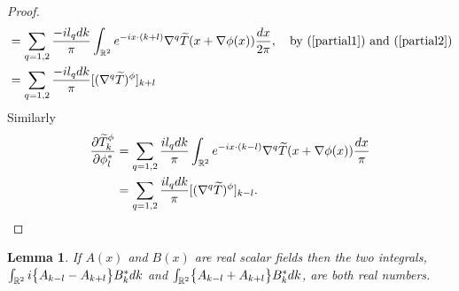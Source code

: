 \documentclass[noinfoline]{imsart}
\newtheorem{lemma}{Lemma}
\begin{document}
\begin{proof}
\begin{align}
\nonumber &= \sum_{q=1,2}\frac{ - il_q  dk}{\pi}  \int_{\Bbb R^2} e^{- ix \cdot (k+l)} \nabla^q\widetilde T(x+\nabla \phi(x))\frac{dx}{2\pi},\quad\text{by (\ref{partial1}) and (\ref{partial2})} \\
&=\sum_{q=1,2}\frac{ - il_q dk}{\pi} [(\nabla^q\widetilde T)^\phi]_{k+l}
\end{align}
Similarly 
\begin{align}
\frac{\partial \widetilde T^\phi_k }{\partial \phi^*_l } 
&= \sum_{q=1,2}  \frac{i l_qd k}{\pi}\int_{\Bbb R^2} e^{-ix \cdot (k-l)} \nabla^q\widetilde T(x+\nabla \phi(x))\frac{dx}{\pi} \\
 &=\sum_{q=1,2}\frac{ il_q dk}{\pi} [(\nabla^q\widetilde T)^\phi]_{k-l}.
\end{align}
\end{proof}





\begin{lemma} 
\label{forreal}
If $A(x)$ and $B(x)$ are real scalar fields then  the two  integrals,  $\int_{\Bbb R^2} i\bigl\{ A_{k-l}  -   A_{k+l}  \bigr\} B^*_k dk$ and  $\int_{\Bbb R^2}\bigl\{  A_{k-l}  +    A_{k+l}   \bigr\} B^*_k dk$, are both real numbers.
\end{lemma}
\end{document}
